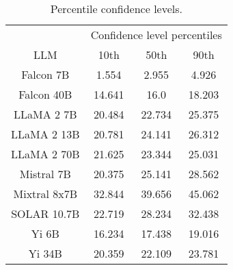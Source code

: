 \begin{table*}
\centering
\begin{tabular}{c|c|c|c}
& \multicolumn{3}{c}{Confidence level percentiles} \\ 
LLM & 10th & 50th & 90th\\ \hline
Falcon 7B & 1.554 & 2.955 & 4.926\\
Falcon 40B & 14.641 & 16.0 & 18.203\\
LLaMA 2 7B & 20.484 & 22.734 & 25.375\\
LLaMA 2 13B & 20.781 & 24.141 & 26.312\\
LLaMA 2 70B & 21.625 & 23.344 & 25.031\\
Mistral 7B & 20.375 & 25.141 & 28.562\\
Mixtral 8x7B & 32.844 & 39.656 & 45.062\\
SOLAR 10.7B & 22.719 & 28.234 & 32.438\\
Yi 6B & 16.234 & 17.438 & 19.016\\
Yi 34B & 20.359 & 22.109 & 23.781\\
\hline
\end{tabular}
\caption{Percentile confidence levels.}
\label{tab:percentile_conf}
\end{table*}
